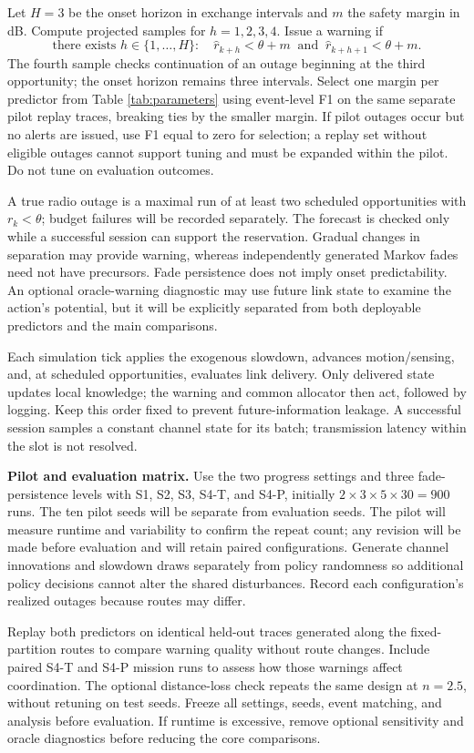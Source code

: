 Let $H=3$ be the onset horizon in exchange intervals and $m$ the safety margin in dB. Compute projected samples for $h=1,2,3,4$. Issue a warning if
\begin{equation}
\label{eq:warning-rule}
\text{there exists }h\in\{1,\ldots,H\}:\quad
\hat r_{k+h}<\theta+m\ \text{ and }\ \hat r_{k+h+1}<\theta+m.
\end{equation}
The fourth sample checks continuation of an outage beginning at the third opportunity; the onset horizon remains three intervals. Select one margin per predictor from Table \ref{tab:parameters} using event-level F1 on the same separate pilot replay traces, breaking ties by the smaller margin. If pilot outages occur but no alerts are issued, use F1 equal to zero for selection; a replay set without eligible outages cannot support tuning and must be expanded within the pilot. Do not tune on evaluation outcomes.

A true radio outage is a maximal run of at least two scheduled opportunities with $r_k<\theta$; budget failures will be recorded separately. The forecast is checked only while a successful session can support the reservation. Gradual changes in separation may provide warning, whereas independently generated Markov fades need not have precursors. Fade persistence does not imply onset predictability. An optional oracle-warning diagnostic may use future link state to examine the action's potential, but it will be explicitly separated from both deployable predictors and the main comparisons.

Each simulation tick applies the exogenous slowdown, advances motion/sensing, and, at scheduled opportunities, evaluates link delivery. Only delivered state updates local knowledge; the warning and common allocator then act, followed by logging. Keep this order fixed to prevent future-information leakage. A successful session samples a constant channel state for its batch; transmission latency within the slot is not resolved.

\textbf{Pilot and evaluation matrix.}
Use the two progress settings and three fade-persistence levels with S1, S2, S3, S4-T, and S4-P, initially $2\times3\times5\times30=900$ runs. The ten pilot seeds will be separate from evaluation seeds. The pilot will measure runtime and variability to confirm the repeat count; any revision will be made before evaluation and will retain paired configurations. Generate channel innovations and slowdown draws separately from policy randomness so additional policy decisions cannot alter the shared disturbances. Record each configuration's realized outages because routes may differ.

Replay both predictors on identical held-out traces generated along the fixed-partition routes to compare warning quality without route changes. Include paired S4-T and S4-P mission runs to assess how those warnings affect coordination. The optional distance-loss check repeats the same design at $n=2.5$, without retuning on test seeds. Freeze all settings, seeds, event matching, and analysis before evaluation. If runtime is excessive, remove optional sensitivity and oracle diagnostics before reducing the core comparisons.
